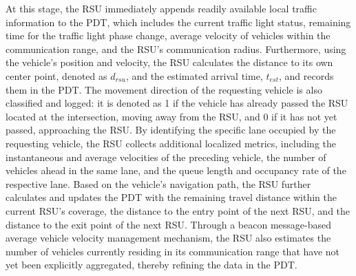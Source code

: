 \documentclass[journal]{IEEEtran}
\begin{document}
At this stage, the RSU immediately appends readily available local traffic information to the PDT, which includes the current traffic light status, remaining time for the traffic light phase change, average velocity of vehicles within the communication range, and the RSU's communication radius. Furthermore, using the vehicle's position and velocity, the RSU calculates the distance to its own center point, denoted as $d_{rsu}$, and the estimated arrival time, $t_{est}$, and records them in the PDT. The movement direction of the requesting vehicle is also classified and logged: it is denoted as 1 if the vehicle has already passed the RSU located at the intersection, moving away from the RSU, and 0 if it has not yet passed, approaching the RSU. By identifying the specific lane occupied by the requesting vehicle, the RSU collects additional localized metrics, including the instantaneous and average velocities of the preceding vehicle, the number of vehicles ahead in the same lane, and the queue length and occupancy rate of the respective lane. Based on the vehicle's navigation path, the RSU further calculates and updates the PDT with the remaining travel distance within the current RSU's coverage, the distance to the entry point of the next RSU, and the distance to the exit point of the next RSU. Through a beacon message-based average vehicle velocity management mechanism, the RSU also estimates the number of vehicles currently residing in its communication range that have not yet been explicitly aggregated, thereby refining the data in the PDT.
\end{document}
